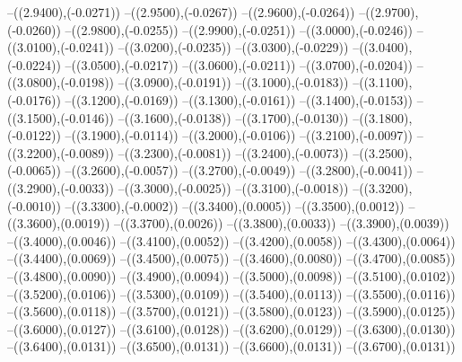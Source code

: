 {	--({\sx*(2.9400)},{\sy*(-0.0271)})
	--({\sx*(2.9500)},{\sy*(-0.0267)})
	--({\sx*(2.9600)},{\sy*(-0.0264)})
	--({\sx*(2.9700)},{\sy*(-0.0260)})
	--({\sx*(2.9800)},{\sy*(-0.0255)})
	--({\sx*(2.9900)},{\sy*(-0.0251)})
	--({\sx*(3.0000)},{\sy*(-0.0246)})
	--({\sx*(3.0100)},{\sy*(-0.0241)})
	--({\sx*(3.0200)},{\sy*(-0.0235)})
	--({\sx*(3.0300)},{\sy*(-0.0229)})
	--({\sx*(3.0400)},{\sy*(-0.0224)})
	--({\sx*(3.0500)},{\sy*(-0.0217)})
	--({\sx*(3.0600)},{\sy*(-0.0211)})
	--({\sx*(3.0700)},{\sy*(-0.0204)})
	--({\sx*(3.0800)},{\sy*(-0.0198)})
	--({\sx*(3.0900)},{\sy*(-0.0191)})
	--({\sx*(3.1000)},{\sy*(-0.0183)})
	--({\sx*(3.1100)},{\sy*(-0.0176)})
	--({\sx*(3.1200)},{\sy*(-0.0169)})
	--({\sx*(3.1300)},{\sy*(-0.0161)})
	--({\sx*(3.1400)},{\sy*(-0.0153)})
	--({\sx*(3.1500)},{\sy*(-0.0146)})
	--({\sx*(3.1600)},{\sy*(-0.0138)})
	--({\sx*(3.1700)},{\sy*(-0.0130)})
	--({\sx*(3.1800)},{\sy*(-0.0122)})
	--({\sx*(3.1900)},{\sy*(-0.0114)})
	--({\sx*(3.2000)},{\sy*(-0.0106)})
	--({\sx*(3.2100)},{\sy*(-0.0097)})
	--({\sx*(3.2200)},{\sy*(-0.0089)})
	--({\sx*(3.2300)},{\sy*(-0.0081)})
	--({\sx*(3.2400)},{\sy*(-0.0073)})
	--({\sx*(3.2500)},{\sy*(-0.0065)})
	--({\sx*(3.2600)},{\sy*(-0.0057)})
	--({\sx*(3.2700)},{\sy*(-0.0049)})
	--({\sx*(3.2800)},{\sy*(-0.0041)})
	--({\sx*(3.2900)},{\sy*(-0.0033)})
	--({\sx*(3.3000)},{\sy*(-0.0025)})
	--({\sx*(3.3100)},{\sy*(-0.0018)})
	--({\sx*(3.3200)},{\sy*(-0.0010)})
	--({\sx*(3.3300)},{\sy*(-0.0002)})
	--({\sx*(3.3400)},{\sy*(0.0005)})
	--({\sx*(3.3500)},{\sy*(0.0012)})
	--({\sx*(3.3600)},{\sy*(0.0019)})
	--({\sx*(3.3700)},{\sy*(0.0026)})
	--({\sx*(3.3800)},{\sy*(0.0033)})
	--({\sx*(3.3900)},{\sy*(0.0039)})
	--({\sx*(3.4000)},{\sy*(0.0046)})
	--({\sx*(3.4100)},{\sy*(0.0052)})
	--({\sx*(3.4200)},{\sy*(0.0058)})
	--({\sx*(3.4300)},{\sy*(0.0064)})
	--({\sx*(3.4400)},{\sy*(0.0069)})
	--({\sx*(3.4500)},{\sy*(0.0075)})
	--({\sx*(3.4600)},{\sy*(0.0080)})
	--({\sx*(3.4700)},{\sy*(0.0085)})
	--({\sx*(3.4800)},{\sy*(0.0090)})
	--({\sx*(3.4900)},{\sy*(0.0094)})
	--({\sx*(3.5000)},{\sy*(0.0098)})
	--({\sx*(3.5100)},{\sy*(0.0102)})
	--({\sx*(3.5200)},{\sy*(0.0106)})
	--({\sx*(3.5300)},{\sy*(0.0109)})
	--({\sx*(3.5400)},{\sy*(0.0113)})
	--({\sx*(3.5500)},{\sy*(0.0116)})
	--({\sx*(3.5600)},{\sy*(0.0118)})
	--({\sx*(3.5700)},{\sy*(0.0121)})
	--({\sx*(3.5800)},{\sy*(0.0123)})
	--({\sx*(3.5900)},{\sy*(0.0125)})
	--({\sx*(3.6000)},{\sy*(0.0127)})
	--({\sx*(3.6100)},{\sy*(0.0128)})
	--({\sx*(3.6200)},{\sy*(0.0129)})
	--({\sx*(3.6300)},{\sy*(0.0130)})
	--({\sx*(3.6400)},{\sy*(0.0131)})
	--({\sx*(3.6500)},{\sy*(0.0131)})
	--({\sx*(3.6600)},{\sy*(0.0131)})
	--({\sx*(3.6700)},{\sy*(0.0131)})
}
